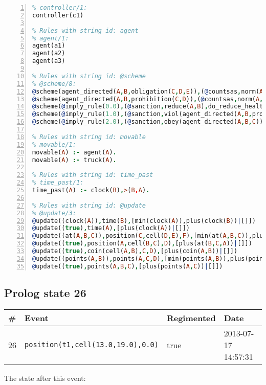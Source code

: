 \documentclass[11pt]{article}\usepackage[utf8]{inputenc}\usepackage{geometry}
\begin{document}
\begin{lstlisting}[language=Prolog, numbers=left]
% Rules with string id: controller
% controller/1:
controller(c1)

% Rules with string id: agent
% agent/1:
agent(a1)
agent(a2)
agent(a3)

% Rules with string id: @scheme
% @scheme/8:
@scheme(agent_directed(A,B,obligation(C,D,E)),(@countsas,norm(A,B,F,obligation(C,D,E)),F),false,(listTrue(C)),(time_past(D)),false,[plus(viol(agent_directed(A,B,obligation(C,D,E))))|[]],[plus(obey(agent_directed(A,B,obligation(C,D,E))))|[]])
@scheme(agent_directed(A,B,prohibition(C,D)),(@countsas,norm(A,B,E,prohibition(C,D)),E),(listTrue(C)),false,(false),false,[plus(viol(agent_directed(A,B,prohibition(C,D))))|[]],[plus(obey(agent_directed(A,B,prohibition(C,D))))|[]])
@scheme(@imply_rule(0.0),(@sanction,reduce(A,B),do_reduce_health(A,B),notifyAgent(A,changed(status))),true,false,false,false,[min(reduce(A,B))|[]],[])
@scheme(@imply_rule(1.0),(@sanction,viol(agent_directed(A,B,prohibition(C,D))),do_sanction(D)),true,false,false,false,[min(viol(agent_directed(A,B,prohibition(C,D))))|[]],[])
@scheme(@imply_rule(2.0),(@sanction,obey(agent_directed(A,B,C))),true,false,false,false,[min(obey(agent_directed(A,B,C)))|[]],[])

% Rules with string id: movable
% movable/1:
movable(A) :- agent(A).
movable(A) :- truck(A).

% Rules with string id: time_past
% time_past/1:
time_past(A) :- clock(B),>(B,A).

% Rules with string id: @update
% @update/3:
@update((clock(A)),time(B),[min(clock(A)),plus(clock(B))|[]])
@update((true),time(A),[plus(clock(A))|[]])
@update((at(A,B,C)),position(C,cell(D,E),F),[min(at(A,B,C)),plus(at(D,E,C))|[]])
@update((true),position(A,cell(B,C),D),[plus(at(B,C,A))|[]])
@update((true),coin(cell(A,B),C,D),[plus(coin(A,B))|[]])
@update((points(A,B)),points(A,C,D),[min(points(A,B)),plus(points(A,D))|[]])
@update((true),points(A,B,C),[plus(points(A,C))|[]])

\end{lstlisting}
\clearpage 
\subsection{Prolog state 26}
\begin{table}[ht]
\centering 
\begin{tabular}{l l l l} 
\textbf{\#} & \textbf{Event} & \textbf{Regimented} & \textbf{Date} \\ [0.5ex] 
\hline
26&\texttt{position(t1,cell(13.0,19.0),0.0)}&true&2013-07-17 14:57:31\\ [1ex] \hline\end{tabular}
\end{table}
The state after this event:
\end{document}
